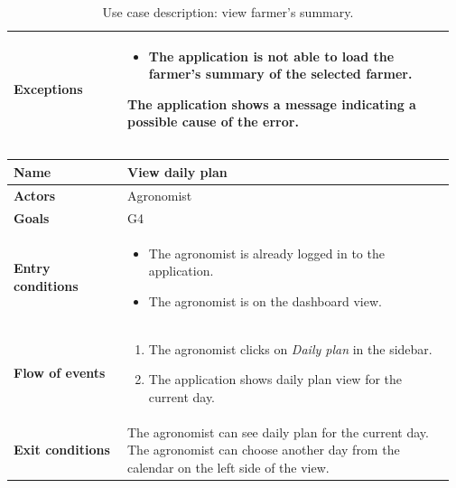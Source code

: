 \begin{table}[H]
\begin{tabular}{@{}p{0.25\linewidth} p{0.72\linewidth}@{}}
		\textbf{Exceptions}         & 
	    \begin{itemize}[leftmargin=.4cm,noitemsep,topsep=0pt,before=\vspace{-3mm}]
		   \item The application is not able to load the farmer's summary of the selected farmer.
		\end{itemize}
		The application shows a message indicating a possible cause of the error.
		\\\bottomrule
	\end{tabular}
	\caption{Use case description: view farmer's summary.} 
\end{table}

\begin{table}[H]
    \centering
	\begin{tabular}{@{}p{0.25\linewidth} p{0.72\linewidth}@{}}
        \toprule
		\textbf{Name}               & View daily plan\\
		\midrule
		\textbf{Actors}             & Agronomist\\
		\midrule
		\textbf{Goals}              & G4 \\
		\midrule
		
		\textbf{Entry conditions}   & \begin{itemize}[leftmargin=.4cm,noitemsep,topsep=0pt,before=\vspace{-3mm},after=\vspace{-4mm}]
		    \item The agronomist is already logged in to the application.
		    \item The agronomist is on the dashboard view.
		\end{itemize}\\
		\midrule
		
		\textbf{Flow of events}     & \begin{enumerate}[leftmargin=.4cm,noitemsep,topsep=0pt,before=\vspace{-3mm},after=\vspace{-4mm}]
		    \item The agronomist clicks on \textit{Daily plan} in the sidebar.
		    \item The application shows daily plan view for the current day.
		\end{enumerate}\\
		\midrule
		\textbf{Exit conditions}    & The agronomist can see daily plan for the current day. The agronomist can choose another day from the calendar on the left side of the view. \\
		\midrule
		

\end{tabular}
\end{table}

